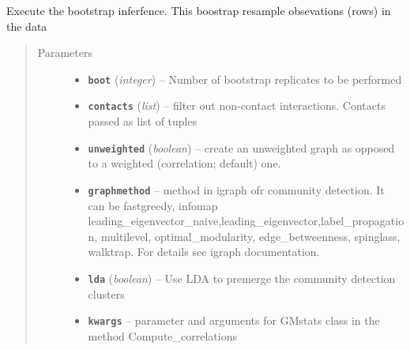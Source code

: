 \documentclass[letterpaper,10pt,english]{sphinxmanual}
\begin{document}
\begin{fulllineitems}
\begin{fulllineitems}
\end{fulllineitems}


\begin{fulllineitems}
\label{Doc:Moduler.SupportClustering.bootstrap}
Execute the bootstrap inferfence. This boostrap resample obsevations (rows) in the data
\begin{quote}\begin{description}
\item[{Parameters}] \leavevmode\begin{itemize}
\item {} 
\textbf{\texttt{boot}} (\emph{integer}) -- Number of bootstrap replicates to be performed

\item {} 
\textbf{\texttt{contacts}} (\emph{list}) -- filter out non-contact interactions. Contacts passed as list of tuples

\item {} 
\textbf{\texttt{unweighted}} (\emph{boolean}) -- create an unweighted graph as opposed to a weighted (correlation; default) one.

\item {} 
\textbf{\texttt{graphmethod}} -- method in igraph ofr community detection. It can be fastgreedy, infomap leading\_eigenvector\_naive,leading\_eigenvector,label\_propagation, multilevel, optimal\_modularity, edge\_betweenness, spinglass, walktrap. For details see igraph documentation.

\item {} 
\textbf{\texttt{lda}} (\emph{boolean}) -- Use LDA to premerge the community detection clusters

\item {} 
\textbf{\texttt{kwargs}} -- parameter and arguments for GMstats class in the method Compute\_correlations

\end{itemize}

\end{description}\end{quote}

\end{fulllineitems}



\end{fulllineitems}
\end{document}
